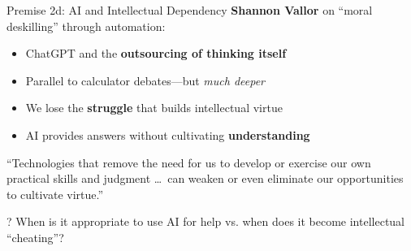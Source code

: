 \documentclass[aspectratio=169]{beamer}
\begin{document}
\begin{frame}{Premise 2d: AI and Intellectual Dependency}
\textbf{Shannon Vallor} on ``moral deskilling'' through automation:

\begin{itemize}
    \item ChatGPT and the \textbf{outsourcing of thinking itself}
    \item Parallel to calculator debates---but \textit{much deeper}
    \item We lose the \textbf{struggle} that builds intellectual virtue
    \item AI provides answers without cultivating \textbf{understanding}
\end{itemize}

\vspace{0.3cm}
\begin{quotebox}
``Technologies that remove the need for us to develop or exercise our own practical skills and judgment \ldots\ can weaken or even eliminate our opportunities to cultivate virtue.''
\end{quotebox}

\begin{alertblock}{?}
When is it appropriate to use AI for help vs. when does it become intellectual ``cheating''?
\end{alertblock}
\end{frame}
\end{document}
